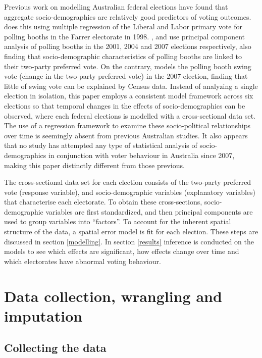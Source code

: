 \documentclass[openany]{book}
\begin{document}
Previous work on modelling Australian federal elections have found that aggregate socio-demographics are relatively good predictors of voting outcomes. \citet{Forrest01} does this using multiple regression of the Liberal and Labor primary vote for polling booths in the Farrer electorate in 1998. \citet{Stimson06}, \citet{Stimson09} and \citet{Stimson12} use principal component analysis of polling booths in the 2001, 2004 and 2007 elections respectively, also finding that socio-demographic characteristics of polling booths are linked to their two-party preferred vote. On the contrary, \citet{Stimson09} models the polling booth swing vote (change in the two-party preferred vote) in the 2007 election, finding that little of swing vote can be explained by Census data. Instead of analyzing a single election in isolation, this paper employs a consistent model framework across six elections so that temporal changes in the effects of socio-demographics can be observed, where each federal elections is modelled with a cross-sectional data set. The use of a regression framework to examine these socio-political relationships over time is seemingly absent from previous Australian studies. It also appears that no study has attempted any type of statistical analysis of socio-demographics in conjunction with voter behaviour in Australia since 2007, making this paper distinctly different from those previous.

The cross-sectional data set for each election consists of the two-party preferred vote (response variable), and socio-demographic variables (explanatory variables) that characterise each electorate. To obtain these cross-sections, socio-demographic variables are first standardized, and then principal components are used to group variables into ``factors''. To account for the inherent spatial structure of the data, a spatial error model is fit for each election. These steps are discussed in section \ref{modelling}. In section \ref{results} inference is conducted on the models to see which effects are significant, how effects change over time and which electorates have abnormal voting behaviour.

\hypertarget{data}{%
\chapter{Data collection, wrangling and imputation}\label{data}}

\hypertarget{collecting-the-data}{%
\section{Collecting the data}\label{collecting-the-data}}
\end{document}
